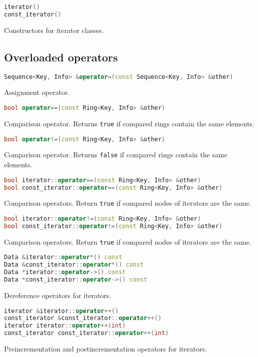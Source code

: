 \documentclass{article}
\begin{document}
\begin{lstlisting}[language=C++]
iterator()
const_iterator()
\end{lstlisting}
Constructors for iterator classes.
\vspace{\baselineskip}

\subsection{Overloaded operators}

\begin{lstlisting}[language=C++]
Sequence<Key, Info> &operator=(const Sequence<Key, Info> &other)
\end{lstlisting}
Assignment operator.

\newpage
\begin{lstlisting}[language=C++]
bool operator==(const Ring<Key, Info> &other)
\end{lstlisting}
Comparison operator. Returns {\tt true} if compared rings contain the same elements.

\begin{lstlisting}[language=C++]
bool operator!=(const Ring<Key, Info> &other)
\end{lstlisting}
Comparison operator. Returns {\tt false} if compared rings contain the same elements.

\begin{lstlisting}[language=C++]
bool iterator::operator==(const Ring<Key, Info> &other)
bool const_iterator::operator==(const Ring<Key, Info> &other)
\end{lstlisting}
Comparison operators. Return {\tt true} if compared nodes of iterators are the same.

\begin{lstlisting}[language=C++]
bool iterator::operator!=(const Ring<Key, Info> &other)
bool const_iterator::operator!=(const Ring<Key, Info> &other)
\end{lstlisting}
Comparison operators. Return {\tt true} if compared nodes of iterators are the same.

\begin{lstlisting}[language=C++]
Data &iterator::operator*() const
Data &const_iterator::operator*() const
Data *iterator::operator->() const
Data *const_iterator::operator->() const
\end{lstlisting}
Dereference operators for iterators.

\begin{lstlisting}[language=C++]
iterator &iterator::operator++()
const_iterator &const_iterator::operator++()
iterator iterator::operator++(int)
const_iterator const_iterator::operator++(int)
\end{lstlisting}
Preincrementation and postincrementation operators for iterators.
\end{document}
